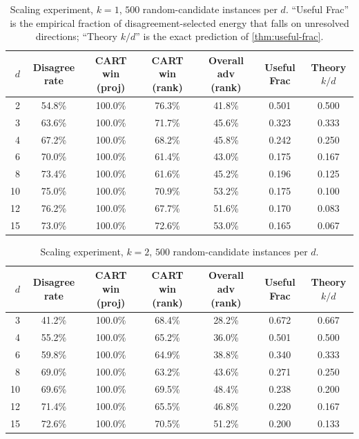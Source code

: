 \documentclass{article}
\theoremstyle{plain}
\theoremstyle{definition}
\theoremstyle{remark}
\begin{document}
\begin{table}[h]
\caption{Scaling experiment, $k\!=\!1$, $500$ random-candidate instances
per $d$. ``Useful Frac'' is the empirical fraction of disagreement-selected
energy that falls on unresolved directions; ``Theory $k/d$'' is the exact
prediction of \cref{thm:useful-frac}.}
\centering
\small
\begin{tabular}{r c c c c c c}
\toprule
$d$ & Disagree rate & CART win (proj) & CART win (rank) & Overall adv (rank) & Useful Frac & Theory $k/d$ \\
\midrule
 2 & 54.8\% & 100.0\% & 76.3\% & 41.8\% & 0.501 & 0.500 \\
 3 & 63.6\% & 100.0\% & 71.7\% & 45.6\% & 0.323 & 0.333 \\
 4 & 67.2\% & 100.0\% & 68.2\% & 45.8\% & 0.242 & 0.250 \\
 6 & 70.0\% & 100.0\% & 61.4\% & 43.0\% & 0.175 & 0.167 \\
 8 & 73.4\% & 100.0\% & 61.6\% & 45.2\% & 0.196 & 0.125 \\
10 & 75.0\% & 100.0\% & 70.9\% & 53.2\% & 0.175 & 0.100 \\
12 & 76.2\% & 100.0\% & 67.7\% & 51.6\% & 0.170 & 0.083 \\
15 & 73.0\% & 100.0\% & 72.6\% & 53.0\% & 0.165 & 0.067 \\
\bottomrule
\end{tabular}
\end{table}

\begin{table}[h]
\caption{Scaling experiment, $k\!=\!2$, $500$ random-candidate instances
per $d$.}
\centering
\small
\begin{tabular}{r c c c c c c}
\toprule
$d$ & Disagree rate & CART win (proj) & CART win (rank) & Overall adv (rank) & Useful Frac & Theory $k/d$ \\
\midrule
 3 & 41.2\% & 100.0\% & 68.4\% & 28.2\% & 0.672 & 0.667 \\
 4 & 55.2\% & 100.0\% & 65.2\% & 36.0\% & 0.501 & 0.500 \\
 6 & 59.8\% & 100.0\% & 64.9\% & 38.8\% & 0.340 & 0.333 \\
 8 & 69.0\% & 100.0\% & 63.2\% & 43.6\% & 0.271 & 0.250 \\
10 & 69.6\% & 100.0\% & 69.5\% & 48.4\% & 0.238 & 0.200 \\
12 & 71.4\% & 100.0\% & 65.5\% & 46.8\% & 0.220 & 0.167 \\
15 & 72.6\% & 100.0\% & 70.5\% & 51.2\% & 0.200 & 0.133 \\
\bottomrule
\end{tabular}
\end{table}
\end{document}
